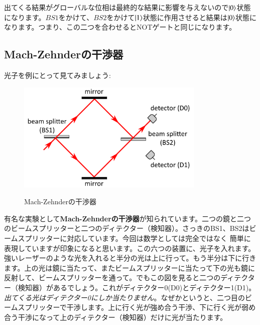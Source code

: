 出てくる結果がグローバルな位相は最終的な結果に影響を与えないので$\ket{0}$状態になります。$BS1$をかけて、$BS2$をかけて$\ket{1}$状態に作用させると結果は$\ket{0}$状態になります。つまり、この二つを合わせるとNOTゲートと同じになります。
\subsection{Mach-Zehnderの干渉器}
光子を例にとって見てみましょう:
\begin{figure}[H]
   \centering
    \includegraphics[width=0.8\textwidth]{lesson6/mach_zehnder.pdf}
    \label{fig: 1}
    \begin{center}
        \caption{Mach-Zehnderの干渉器}
    \end{center}
\end{figure}

有名な実験として\textbf{Mach-Zehnderの干渉器}が知られています。二つの鏡と二つのビームスプリッターと二つのディテクター（検知器）。さっきのBS1、BS2はビームスプリッターに対応しています。今回は数学としては完全ではなく
簡単に表現していますが印象になると思います。この六つの装置に、光子を入れます。強いレーザーのような光を入れると半分の光は上に行って。もう半分は下に行きます。上の光は鏡に当たって、またビームスプリッターに当たって下の光も鏡に反射して、ビームスプリッターを通って。でもこの図を見ると二つのディテクター（検知器）があるでしょう。これがディテクター0(D0)とディテクター1(D1)。\textit{出てくる光はディテクター0にしか当たりません}。なぜかというと、二つ目のビームスプリッターで干渉します。上に行く光が強め合う干渉、下に行く光が弱め合う干渉になって上のディテクター（検知器）だけに光が当たります。

